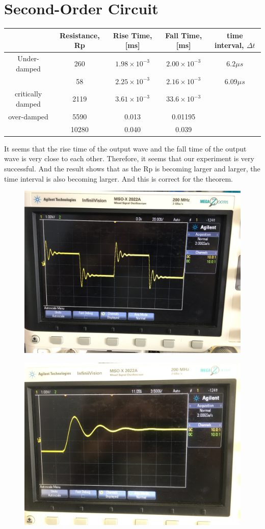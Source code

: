 \documentclass{article}
\begin{document}
\section{Second-Order Circuit}
\begin{tabular}{|c|c|c|c|c|}
	\hline 
	&Resistance, Rp& Rise Time,[ms] & Fall Time,[ms] &  time interval, $\Delta t$  \\ 
	\hline 
	Under-damped& 260 & $1.98\times10^{-3}$ & $2.00\times10^{-3}$ & $6.2\mu s$ \\ 
	\hline 
	& 58 & $2.25\times10^{-3}$ & $2.16\times10^{-3}$ & $6.09\mu s$ \\ 
	\hline 
	critically damped& 2119 & $3.61\times 10^{-3}$ & 3$3.6\times 10^{-3}$ &  \\ 
	\hline 
	over-damped& 5590 & 0.013 & 0.01195 &  \\ 
	\hline 
	& 10280 & 0.040 & 0.039 &  \\ 
	\hline 
\end{tabular} 
It seems that the rise time of the output wave and the fall time of the output wave is very close to each other. Therefore, it seems that our experiment is very successful. And the result shows that as the Rp is becoming larger and larger, the time interval is also becoming larger. And this is correct for the theorem.
\begin{figure}[H]
	\centering
	\includegraphics[width=0.7\linewidth]{IMG_6439}
	\label{fig:img6439}
\end{figure}
\begin{figure}[H]
	\centering
	\includegraphics[width=0.7\linewidth]{IMG_6440}
	\label{fig:img6440}
\end{figure}
\end{document}
